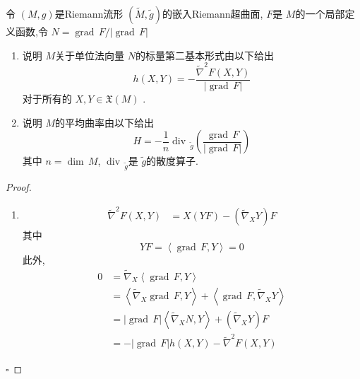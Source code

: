 \documentclass[../../几何与拓扑.tex]{subfiles}
\begin{document}
\begin{problem}
    令 \(  \left( M,g \right)   \)是Riemann流形 \(  \left( \tilde{M},\tilde{g} \right)   \)的嵌入Riemann超曲面,  \(  F  \)是 \(  M  \)的一个局部定义函数,令 \(  N =  \operatorname{grad}\,F / \left| \operatorname{grad}\,F \right|   \)
    \begin{enumerate}
        \item 说明 \(  M  \)关于单位法向量 \(  N  \)的标量第二基本形式由以下给出 \[
        h\left( X,Y \right)=  - \frac{ \tilde{\nabla} ^{2}F\left( X,Y \right)  }{\left| \operatorname{grad}\,F \right|  }  
        \]对于所有的 \(  X,Y \in \mathfrak{X}\left( M \right)   \)  . 
        \item 说明 \(  M  \)的平均曲率由以下给出 \[
        H =  -\frac{1 }{n } \operatorname{div}\,_{\tilde{g}}\left( \frac{\operatorname{grad}\,F }{\left| \operatorname{grad}\,F \right|  }  \right)  
        \]其中 \(  n =  \operatorname{dim}\,M  \), \(  \operatorname{div}\,_{\tilde{g}}  \)是 \(  \tilde{g}  \)的散度算子.    
    \end{enumerate}
         
\end{problem}
\begin{proof}
    \begin{enumerate}
        \item  \[
       \begin{aligned}
        \tilde{\nabla}^{2} F\left( X,Y \right)&= X\left( Y F \right)  - \left(  \tilde{\nabla} _{X}Y \right)  F
       \end{aligned}
        \]其中 \[
        Y F =  \left<\operatorname{grad}\,F,Y \right>= 0
        \]此外, \[
        \begin{aligned}
            0 &=  \tilde{\nabla} _{X}\left<\operatorname{grad}\,F,Y \right> \\ 
             &=  \left<  \tilde{\nabla} _{X}  \operatorname{grad}\,F, Y\right>+ \left<\operatorname{grad}\,F,  \tilde{\nabla} _{X}Y \right> \\ 
              &= \left| \operatorname{grad}\,F \right| \left< \tilde{\nabla} _{X}N,Y \right>+  \left(  \tilde{\nabla} _{X}Y \right)F  \\ 
               &=  - \left| \operatorname{grad}\,F \right|   h\left( X,Y \right) -  \tilde{\nabla} ^{2}F\left( X,Y \right)  
        \end{aligned} 
        \]
    \end{enumerate}
    

    \hfill $\square$
\end{proof}
\hspace*{\fill} 
\end{document}
